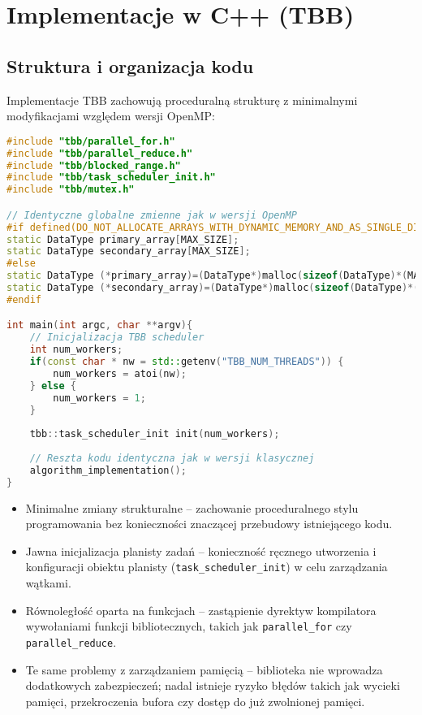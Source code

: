 \section{Implementacje w C++ (TBB)}
\subsection{Struktura i organizacja kodu}
Implementacje TBB zachowują proceduralną strukturę z minimalnymi modyfikacjami względem wersji OpenMP:
\begin{lstlisting}[language=C++, caption={Implementacja TBB - struktura kodu}, label={lst:tbb-structure}]
#include "tbb/parallel_for.h"
#include "tbb/parallel_reduce.h"
#include "tbb/blocked_range.h"
#include "tbb/task_scheduler_init.h"
#include "tbb/mutex.h"

// Identyczne globalne zmienne jak w wersji OpenMP
#if defined(DO_NOT_ALLOCATE_ARRAYS_WITH_DYNAMIC_MEMORY_AND_AS_SINGLE_DIMENSION)
static DataType primary_array[MAX_SIZE];
static DataType secondary_array[MAX_SIZE];
#else
static DataType (*primary_array)=(DataType*)malloc(sizeof(DataType)*(MAX_SIZE));
static DataType (*secondary_array)=(DataType*)malloc(sizeof(DataType)*(MAX_SIZE));
#endif

int main(int argc, char **argv){
    // Inicjalizacja TBB scheduler
    int num_workers;
    if(const char * nw = std::getenv("TBB_NUM_THREADS")) {
        num_workers = atoi(nw);
    } else {
        num_workers = 1;
    }
    
    tbb::task_scheduler_init init(num_workers);
    
    // Reszta kodu identyczna jak w wersji klasycznej
    algorithm_implementation();
}
\end{lstlisting}
\begin{itemize}
    \item Minimalne zmiany strukturalne – zachowanie proceduralnego stylu programowania bez konieczności znaczącej przebudowy istniejącego kodu.
    
    \item Jawna inicjalizacja planisty zadań – konieczność ręcznego utworzenia i konfiguracji obiektu planisty (\texttt{task\_scheduler\_init}) w celu zarządzania wątkami.
    
    \item Równoległość oparta na funkcjach – zastąpienie dyrektyw kompilatora wywołaniami funkcji bibliotecznych, takich jak \texttt{parallel\_for} czy \texttt{parallel\_reduce}.
    
    \item Te same problemy z zarządzaniem pamięcią – biblioteka nie wprowadza dodatkowych zabezpieczeń; nadal istnieje ryzyko błędów takich jak wycieki pamięci, przekroczenia bufora czy dostęp do już zwolnionej pamięci.
\end{itemize}
  
